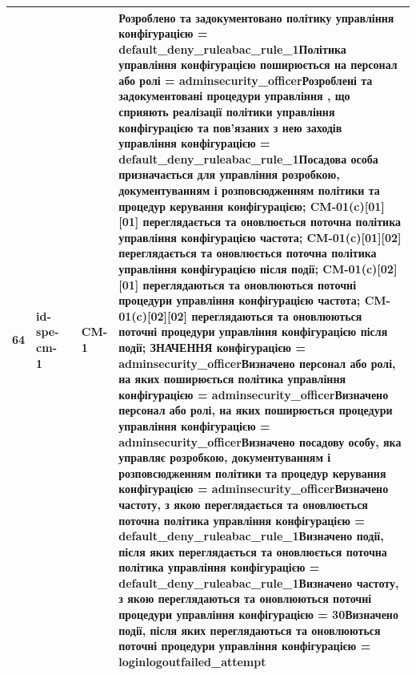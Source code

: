 \documentclass[10pt]{article}
\begin{document}
\begin{longtable}{|c|>{\raggedright\arraybackslash}p{2.5cm}|>{\raggedright\arraybackslash}p{4.5cm}|>{\raggedright\arraybackslash}p{3cm}|>{\raggedright\arraybackslash}p{4.5cm}|}
64 & id-spe-cm-1 &  & CM-1 & Розроблено та задокументовано політику управління конфігурацією = \textbf{default\_\allowbreak{}deny\_\allowbreak{}ruleabac\_\allowbreak{}rule\_\allowbreak{}1}\newline Політика управління конфігурацією поширюється на персонал або ролі = \textbf{adminsecurity\_\allowbreak{}officer}\newline Розроблені та задокументовані процедури управління , що сприяють реалізації політики управління конфігурацією та пов'язаних з нею заходів управління конфігурацією = \textbf{default\_\allowbreak{}deny\_\allowbreak{}ruleabac\_\allowbreak{}rule\_\allowbreak{}1}\newline Посадова особа призначається для управління розробкою, документуванням і розповсюдженням політики та процедур керування конфігурацією; CM-01(c)[01][01] переглядається та оновлюється поточна політика управління конфігурацією частота; CM-01(c)[01][02] переглядається та оновлюється поточна політика управління конфігурацією після події; CM-01(c)[02][01] переглядаються та оновлюються поточні процедури управління конфігурацією частота; CM-01(c)[02][02] переглядаються та оновлюються поточні процедури управління конфігурацією після події; ЗНАЧЕННЯ конфігурацією = \textbf{adminsecurity\_\allowbreak{}officer}\newline Визначено персонал або ролі, на яких поширюється політика управління конфігурацією = \textbf{adminsecurity\_\allowbreak{}officer}\newline Визначено персонал або ролі, на яких поширюється процедури управління конфігурацією = \textbf{adminsecurity\_\allowbreak{}officer}\newline Визначено посадову особу, яка управляє розробкою, документуванням і розповсюдженням політики та процедур керування конфігурацією = \textbf{adminsecurity\_\allowbreak{}officer}\newline Визначено частоту, з якою переглядається та оновлюється поточна політика управління конфігурацією = \textbf{default\_\allowbreak{}deny\_\allowbreak{}ruleabac\_\allowbreak{}rule\_\allowbreak{}1}\newline Визначено події, після яких переглядається та оновлюється поточна політика управління конфігурацією = \textbf{default\_\allowbreak{}deny\_\allowbreak{}ruleabac\_\allowbreak{}rule\_\allowbreak{}1}\newline Визначено частоту, з якою переглядаються та оновлюються поточні процедури управління конфігурацією = \textbf{30}\newline Визначено події, після яких переглядаються та оновлюються поточні процедури управління конфігурацією = \textbf{loginlogoutfailed\_\allowbreak{}attempt} \\ \hline

\end{longtable}
\end{document}
